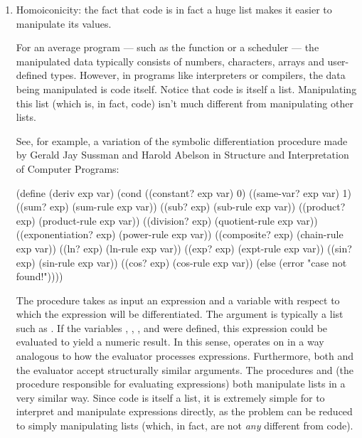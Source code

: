   \begin{enumerate}
    \item Homoiconicity: the fact that  code is in fact a huge  list makes it easier to manipulate its values.

    For an average program --- such as the  function or a scheduler --- the manipulated data typically consists of numbers, characters, arrays and user-defined types. However, in programs like interpreters or compilers, the data being manipulated is code itself. Notice that  code is itself a  list. Manipulating this list (which is, in fact, code) isn't much different from manipulating other lists.

    See, for example, a variation of the symbolic differentiation procedure made by Gerald Jay Sussman and Harold Abelson in Structure and Interpretation of Computer Programs\cite{sicp}:

    \begin{code}
(define (deriv exp var)
  (cond ((constant? exp var)   0)
        ((same-var? exp var)   1)
        ((sum? exp)            (sum-rule      exp var))
        ((sub? exp)            (sub-rule      exp var))
        ((product? exp)        (product-rule  exp var))
        ((division? exp)       (quotient-rule exp var))
        ((exponentiation? exp) (power-rule    exp var))
        ((composite? exp)      (chain-rule    exp var))
        ((ln? exp)             (ln-rule       exp var))
        ((exp? exp)            (expt-rule     exp var))
        ((sin? exp)            (sin-rule      exp var))
        ((cos? exp)            (cos-rule      exp var))
        (else
          (error "case not found!"))))
    \end{code}

    The procedure  takes as input an expression  and a variable  with respect to which the expression will be differentiated. The argument  is typically a  list such as . If the variables , , , and  were defined, this expression could be evaluated to yield a numeric result. In this sense,  operates on  in a way analogous to how the evaluator processes expressions. Furthermore, both  and the evaluator accept structurally similar arguments. The procedures  and  (the procedure responsible for evaluating expressions) both manipulate lists in a very similar way. Since  code is itself a  list, it is extremely simple for  to interpret and manipulate expressions directly, as the problem can be reduced to simply manipulating  lists (which, in fact, are not \emph{any} different from  code). %


\end{enumerate}
